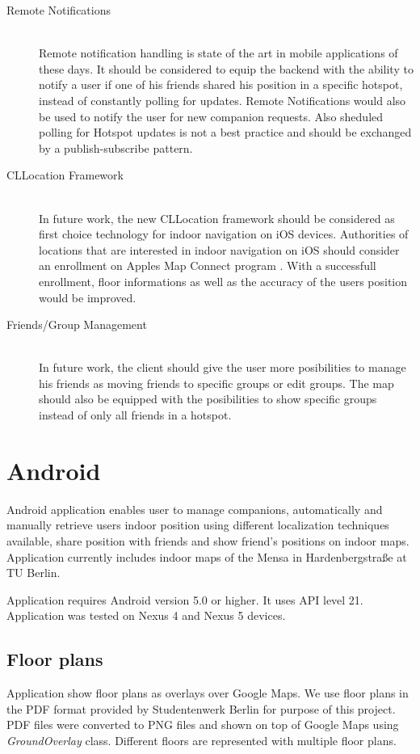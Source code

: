 \begin{description}
  \item[Remote Notifications] \hfill \\
  Remote notification handling is state of the art in mobile applications of these days. It should be considered to equip the backend with the ability to notify a user if one of his friends shared his position in a specific hotspot, instead of constantly polling for updates. Remote Notifications would also be used to notify the user for new companion requests. Also sheduled polling for Hotspot updates is not a best practice and should be exchanged by a publish-subscribe pattern.
  \item[CLLocation Framework] \hfill \\
  In future work, the new CLLocation framework should be considered as first choice technology for indoor navigation on iOS devices. Authorities of locations that are interested in indoor navigation on iOS should consider an enrollment on Apples Map Connect program \cite{MapsConnect}. With a successfull enrollment, floor informations as well as the accuracy of the users position would be improved.
  \item[Friends/Group Management] \hfill \\
  In future work, the client should give the user more posibilities to manage his friends as moving friends to specific groups or edit groups. The map should also be equipped with the posibilities to show specific groups instead of only all friends in a hotspot.

\end{description}

\vspace{0.5cm}

\section{Android}

Android application enables user to manage companions, automatically and manually retrieve users indoor position using different localization techniques available, share position with friends and show friend's positions on indoor maps. Application currently includes indoor maps of the Mensa in Hardenbergstraße at TU Berlin. 

Application requires Android version 5.0 or higher. It uses API level 21. Application was tested on Nexus 4 and Nexus 5 devices.

\subsection{Floor plans}
Application show floor plans as overlays over Google Maps. We use floor plans in the PDF format provided by Studentenwerk Berlin for purpose of this project. PDF files were converted to PNG files and shown on top of Google Maps using \textit{GroundOverlay} class. Different floors are represented with multiple floor plans.

